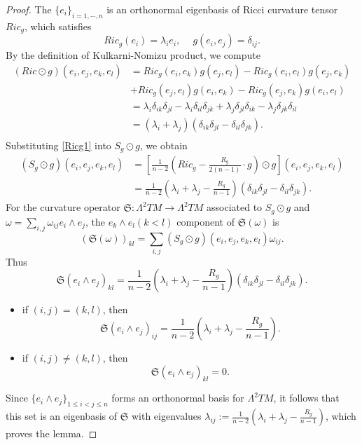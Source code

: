 \documentclass[10pt,a4paper]{amsart}
\def \La {\Lambda}
\def \de {\delta}
\def \la {\lambda}
\def\w {\omega}
\begin{document}
	\begin{proof}
		The $\{e_{i}\}_{i=1,\cdots,n}$ is an orthonormal eigenbasis of Ricci curvature tensor $Ric_{g}$, which satisfies
		\begin{equation*}
		Ric_{g}(e_{i})=\la_{i}e_{i},\ \quad g(e_{i},e_{j})=\de_{ij}.
		\end{equation*}
		By the definition of  Kulkarni-Nomizu product, we compute
		\begin{equation}\label{Ricg1}
		\begin{split}
		(Ric\odot g)(e_{i},e_{j},e_{k},e_{l})&=Ric_{g}(e_{i},e_{k})g(e_{j},e_{l})-Ric_{g}(e_{i},e_{l})g(e_{j},e_{k})\\
		&+Ric_{g}(e_{j},e_{l})g(e_{i},e_{k})-Ric_{g}(e_{j},e_{k})g(e_{i},e_{l})\\
		&=\la_{i}\de_{ik}\de_{jl}-\la_{i}\de_{il}\de_{jk}+\la_{j}\de_{jl}\de_{ik}-\la_{j}\de_{jk}\de_{il}\\
		&=(\la_{i}+\la_{j})(\de_{ik}\de_{jl}-\de_{il}\de_{jk}).\\
		\end{split}
		\end{equation}
		Substituting \eqref{Ricg1} into $S_{g}\odot g$, we obtain
		\begin{equation*}
		\begin{split}
		(S_{g}\odot g)(e_{i},e_{j},e_{k},e_{l})&=\left[\frac{1}{n-2}\left(Ric_{g}-\frac{R_{g}}{2(n-1)}\cdot g\right)\odot g\right](e_{i},e_{j},e_{k},e_{l})\\
		&=\frac{1}{n-2}\left(\la_{i}+\la_{j}-\frac{R_{g}}{n-1}\right)(\de_{ik}\de_{jl}-\de_{il}\de_{jk}).
		\end{split}
		\end{equation*}	
		For the curvature operator $\mathfrak{S}:\La^{2}TM\rightarrow\La^{2}TM$ associated to $S_{g} \odot g$ and $\w=\sum_{i,j}\w_{ij}e_i\wedge e_j$,  the $e_{k}\wedge e_{l}(k<l)$ component of $\mathfrak{S}(\w)$  is
		$$ (\mathfrak{S}(\w))_{kl}=\sum_{i,j}(S_{g}\odot g)(e_{i},e_{j},e_{k},e_{l})\w_{ij}.$$
		Thus
		$$\mathfrak{S}(e_{i}\wedge e_{j})_{kl}=\frac{1}{n-2}(\la_{i}+\la_{j}-\frac{R_{g}}{n-1})(\de_{ik}\de_{jl}-\de_{il}\de_{jk}).$$
		\begin{itemize}
			\item if $(i,j)=(k,l)$, then  
			$$\mathfrak{S}(e_{i}\wedge e_{j})_{ij}=\frac{1}{n-2}(\la_{i}+\la_{j}-\frac{R_{g}}{n-1}).$$
			\item if $(i,j)\neq (k,l)$, then
			$$\mathfrak{S}(e_{i}\wedge e_{j})_{kl}=0.$$
		\end{itemize}
		Since  
		$\{e_{i}\wedge e_{j}\}_{1\leq i<j\leq n}$ forms an orthonormal basis for $\La^{2}TM$, it follows that this set is an eigenbasis of $\mathfrak{S}$ with eigenvalues
		$\la_{ij}:=\frac{1}{n-2}(\la_{i}+\la_{j}-\frac{R_{g}}{n-1})$, which proves the lemma.
	\end{proof}
\end{document}
